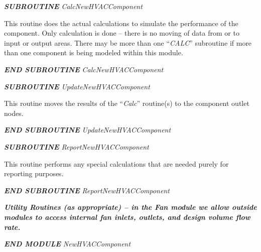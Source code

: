 \textbf{\emph{SUBROUTINE}} \emph{CalcNewHVACComponent}

This routine does the actual calculations to simulate the performance of the component. Only calculation is done -- there is no moving of data from or to input or output areas. There may be more than one ``\emph{CALC}'' subroutine if more than one component is being modeled within this module.

\textbf{\emph{END SUBROUTINE}} \emph{CalcNewHVACComponent}

\textbf{\emph{SUBROUTINE}} \emph{UpdateNewHVACComponent}

This routine moves the results of the ``\emph{Calc}'' routine(s) to the component outlet nodes.

\textbf{\emph{END SUBROUTINE}} \emph{UpdateNewHVACComponent}

\textbf{\emph{SUBROUTINE}} \emph{ReportNewHVACComponent}

This routine performs any special calculations that are needed purely for reporting purposes.

\textbf{\emph{END SUBROUTINE}} \emph{ReportNewHVACComponent}

\textbf{\emph{Utility Routines (as appropriate) -- in the Fan module we allow outside modules to access internal fan inlets, outlets, and design volume flow rate.}}

\textbf{\emph{END MODULE}} \emph{NewHVACComponent}
